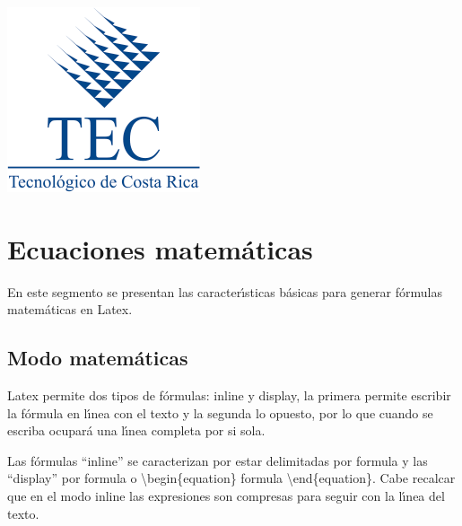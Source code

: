 \documentclass[letterpaper, 10pt, journal]{IEEEtran}
\begin{document}
\begin{minipage}[t]{0.15\textwidth}
\includegraphics[width=\textwidth]{tec-logo}
\end{minipage}

\section{Ecuaciones matem\'aticas}
En este segmento se presentan las caracter\'{\i}sticas b\'{a}sicas para generar f\'{o}rmulas matem\'{a}ticas en Latex.

\subsection{Modo matem\'{a}ticas}
Latex permite dos tipos de f\'{o}rmulas: inline y display, la primera permite escribir la f\'{o}rmula en l\'{\i}nea con el texto y la segunda lo opuesto, por lo que cuando se escriba ocupar\'{a} una l\'{\i}nea completa por si sola.\par
Las f\'{o}rmulas \textquotedblleft{}inline\textquotedblright{} se caracterizan por estar delimitadas por \textdollar{}formula\textdollar{} y las \textquotedblleft{}display\textquotedblright{} por \textdollar{}\textdollar{}formula\textdollar{}\textdollar{} o \textbackslash{}begin\{equation\} formula \textbackslash{}end\{equation\}. Cabe recalcar que en el modo inline las expresiones son compresas para seguir con la l\'{\i}nea del texto.
\end{document}
